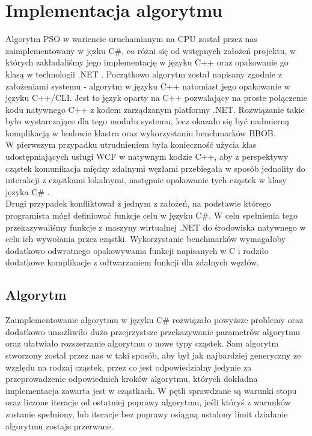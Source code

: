 \documentclass[12pt, twoside, openany, abstract=on]{report}
\theoremstyle{definition}
\begin{document}
\section{Implementacja algorytmu}
Algorytm PSO w wariencie uruchamianym na CPU został przez nas zaimplementowany w jęzku C\#, co różni się od wstępnych założeń projektu, w których zakładaliśmy jego implementację w języku C++ oraz opakowanie go klasą w technologii .NET . Początkowo algorytm został napisany zgodnie z założeniami systemu - algorytm w języku C++ natomiast jego opakowanie w języku C++/CLI. Jest to język oparty na C++ pozwalający na proste połączenie kodu natywnego C++ z kodem zarządzanym platformy .NET. Rozwiązanie takie było wystarczające dla tego modułu systemu, lecz okazało się być nadmierną komplikacją w budowie klastra oraz wykorzystaniu benchmarków BBOB.\\
W pierwszym przypadku utrudnieniem była konieczność użycia klas udostępniających usługi WCF w natywnym kodzie C++, aby  z perspektywy cząstek komunikacja między zdalnymi węzłami przebiegała w sposób jednolity do interakcji z cząstkami lokalnymi, następnie opakowanie tych cząstek w klasy języka C\# .\\
Drugi przypadek konfliktował z jednym z założeń, na podstawie którego programista mógł definiować funkcje celu w języku C\#. W celu spełnienia tego przekazywaliśmy funkcje z maszyny wirtualnej .NET do środowiska natywnego w celu ich wywołania przez cząstki. Wykorzystanie benchmarków wymagałoby dodatkowo odwrotnego opakowywania funkcji napisanych w C i rodziło dodatkowe komplikacje z odtwarzaniem funkcji dla zdalnych węzłów.
\subsection{Algorytm}
Zaimplementowanie algorytmu w języku C\# rozwiązało powyższe problemy oraz dodatkowo umożliwiło dużo przejrzystsze przekazywanie parametrów algorytmu oraz ułatwiało rozszerzanie algorytmu o nowe typy cząstek.
Sam algorytm stworzony został przez nas w taki sposób, aby był jak najbardziej generyczny ze względu na rodzaj cząstek, przez co jest odpowiedzialny jedynie za przeprowadzenie odpowiednich kroków algorytmu, których dokładna implementacja zawarta jest w cząstkach. W pętli sprawdzane są warunki stopu oraz liczone iteracje od ostatniej poprawy algorytmu, jeśli któryś z warunków zostanie spełniony, lub iteracje bez poprawy osiągną ustalony limit działanie algorytmu zostaje przerwane.
\end{document}

